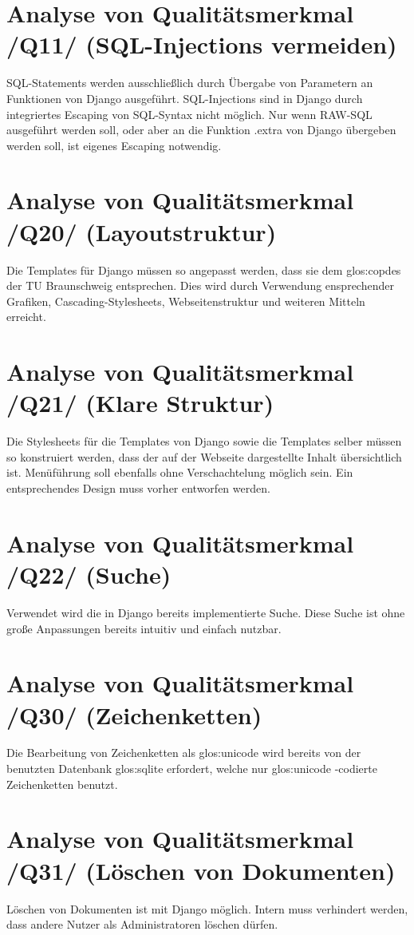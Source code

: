 \section{Analyse von Qualitätsmerkmal /Q11/ (SQL-Injections vermeiden)}

SQL-Statements werden ausschließlich durch Übergabe von Parametern an 
Funktionen von Django ausgeführt. SQL-Injections sind in Django durch 
integriertes Escaping von SQL-Syntax nicht möglich. Nur wenn RAW-SQL 
ausgeführt werden soll, oder aber an die Funktion .extra von Django 
übergeben werden soll, ist eigenes Escaping notwendig.

\section{Analyse von Qualitätsmerkmal /Q20/ (Layoutstruktur)}

Die Templates für Django müssen so angepasst werden, dass sie dem
\Gls{glos:copdes}  der TU Braunschweig entsprechen. Dies wird durch Verwendung
ensprechender Grafiken, Cascading-Stylesheets, Webseitenstruktur und weiteren
Mitteln erreicht.


\section{Analyse von Qualitätsmerkmal /Q21/ (Klare Struktur)}

Die Stylesheets für die Templates von Django sowie die Templates selber
müssen so konstruiert werden, dass der auf der Webseite dargestellte 
Inhalt übersichtlich ist. Menüführung soll ebenfalls ohne Verschachtelung
möglich sein. Ein entsprechendes Design muss vorher entworfen werden.


\section{Analyse von Qualitätsmerkmal /Q22/ (Suche)}


Verwendet wird die in Django bereits implementierte Suche. Diese Suche ist ohne
große Anpassungen bereits intuitiv und einfach nutzbar.


\section{Analyse von Qualitätsmerkmal /Q30/ (Zeichenketten)} 

Die Bearbeitung von Zeichenketten als \Gls{glos:unicode} wird bereits von der benutzten
Datenbank \Gls{glos:sqlite} erfordert, welche nur \Gls{glos:unicode} -codierte Zeichenketten benutzt.


\section{Analyse von Qualitätsmerkmal /Q31/ (Löschen von Dokumenten)} 

Löschen von Dokumenten ist mit Django möglich. Intern muss verhindert werden,
dass andere Nutzer als Administratoren löschen dürfen.
